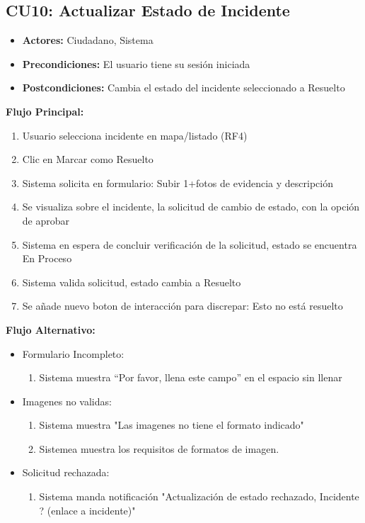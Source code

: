 \begin{multicols}{2}
\subsection*{CU10: Actualizar Estado de Incidente}
\begin{itemize}
    \item \textbf{Actores:} Ciudadano, Sistema
    \item \textbf{Precondiciones:} El usuario tiene su sesión iniciada
    \item \textbf{Postcondiciones:} Cambia el estado del incidente seleccionado a Resuelto
\end{itemize}
\textbf{Flujo Principal:}
\begin{enumerate}
    \item Usuario selecciona incidente en mapa/listado (RF4)
    \item Clic en Marcar como Resuelto
    \item Sistema solicita en formulario: Subir 1+fotos de evidencia y descripción
    \item Se visualiza sobre el incidente, la solicitud de cambio de estado, con la opción de aprobar
    \item Sistema en espera de concluir verificación de la solicitud, estado se encuentra En Proceso
    \item Sistema valida solicitud, estado cambia a Resuelto
    \item Se añade nuevo boton de interacción para discrepar: Esto no está resuelto
\end{enumerate}

\textbf{Flujo Alternativo:}
\begin{itemize}
    \item Formulario Incompleto:
    \begin{enumerate}
        \item Sistema muestra “Por favor, llena este campo” en el espacio sin llenar
    \end{enumerate}
    \item Imagenes no validas:
    \begin{enumerate}
        \item Sistema muestra "Las imagenes no tiene el formato indicado"
        \item Sistemea muestra los requisitos de formatos de imagen.
    \end{enumerate}
    \item Solicitud rechazada:
    \begin{enumerate}
        \item Sistema manda notificación "Actualización de estado rechazado, Incidente ? (enlace a incidente)"
    \end{enumerate}
\end{itemize}


\end{multicols}
